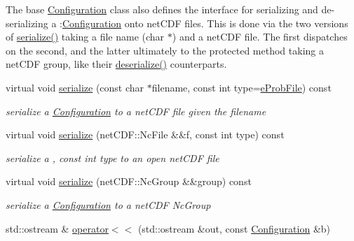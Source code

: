 The base \mbox{\hyperlink{class_s_m_spp__di__unipi__it_1_1_configuration}{Configuration}} class also defines the interface for serializing and de-\/serializing a \+:\mbox{\hyperlink{class_s_m_spp__di__unipi__it_1_1_configuration}{Configuration}} onto net\+C\+DF files. This is done via the two versions of \mbox{\hyperlink{class_s_m_spp__di__unipi__it_1_1_configuration_a761852c919ce4cc745f6a973733340c5}{serialize()}} taking a file name (char $\ast$) and a net\+C\+DF file. The first dispatches on the second, and the latter ultimately to the protected method taking a net\+C\+DF group, like their \mbox{\hyperlink{class_s_m_spp__di__unipi__it_1_1_configuration_a80f801b1a2fd7ab7648faaa9004f06c9}{deserialize()}} counterparts. \begin{DoxyCompactItemize}
\item 
virtual void \mbox{\hyperlink{class_s_m_spp__di__unipi__it_1_1_configuration_a761852c919ce4cc745f6a973733340c5}{serialize}} (const char $\ast$filename, const int type=\mbox{\hyperlink{group___s_m_s__types_ggab8fe98d4e6a9961e16ab25006d6eebd8ab4763484df9e463c82bde775db014c10}{e\+Prob\+File}}) const
\begin{DoxyCompactList}\small\item\em serialize a \mbox{\hyperlink{class_s_m_spp__di__unipi__it_1_1_configuration}{Configuration}} to a net\+C\+DF file given the filename \end{DoxyCompactList}\item 
virtual void \mbox{\hyperlink{class_s_m_spp__di__unipi__it_1_1_configuration_a76975f9a636fcf85b4ed642b58422aaf}{serialize}} (net\+C\+D\+F\+::\+Nc\+File \&\&f, const int type) const
\begin{DoxyCompactList}\small\item\em serialize a , const int type to an open net\+C\+DF file \end{DoxyCompactList}\item 
virtual void \mbox{\hyperlink{class_s_m_spp__di__unipi__it_1_1_configuration_a59f3f59d72c56028f06c555bdcd36caf}{serialize}} (net\+C\+D\+F\+::\+Nc\+Group \&\&group) const
\begin{DoxyCompactList}\small\item\em serialize a \mbox{\hyperlink{class_s_m_spp__di__unipi__it_1_1_configuration}{Configuration}} to a net\+C\+DF Nc\+Group \end{DoxyCompactList}\item 
std\+::ostream \& \mbox{\hyperlink{class_s_m_spp__di__unipi__it_1_1_configuration_ad9926988904739fe7789505dc5292685}{operator$<$$<$}} (std\+::ostream \&out, const \mbox{\hyperlink{class_s_m_spp__di__unipi__it_1_1_configuration}{Configuration}} \&b)

\end{DoxyCompactItemize}
